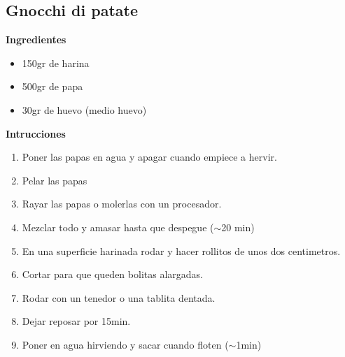 \subsection{Gnocchi di patate}
\textbf{Ingredientes}
\begin{itemize}
\item 150gr de harina
\item 500gr de papa
\item 30gr de huevo (medio huevo)
\end{itemize}

\textbf{Intrucciones}
\begin{enumerate}
\item Poner las papas en agua y apagar cuando empiece a hervir.
\item Pelar las papas
\item Rayar las papas o molerlas con un procesador.
\item Mezclar todo y amasar hasta que despegue ($\sim $20 min)
\item En una superficie harinada rodar y hacer rollitos de unos dos centimetros.
\item Cortar para que queden bolitas alargadas.
\item Rodar con un tenedor o una tablita dentada.
\item Dejar reposar por 15min.
\item Poner en agua hirviendo y sacar cuando floten ($\sim$1min)
\end{enumerate}
